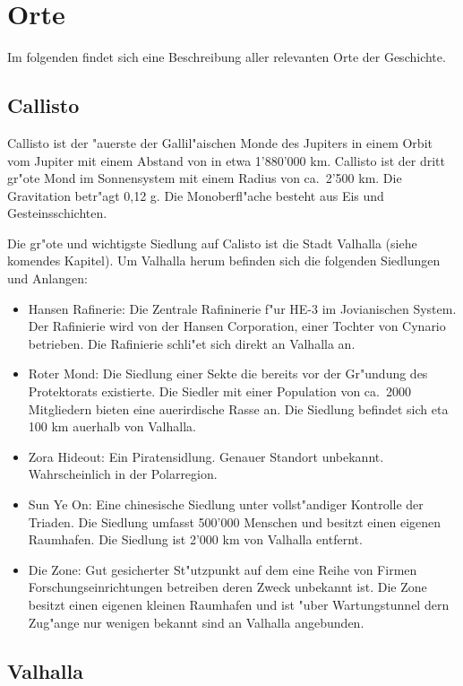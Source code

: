 \section{Orte}

Im folgenden findet sich eine Beschreibung aller relevanten Orte der Geschichte.

\subsection{Callisto}

Callisto ist der "au\3erste der Gallil"aischen Monde des Jupiters in einem Orbit vom Jupiter mit einem Abstand von in
etwa 1'880'000 km. Callisto ist der dritt gr"o\3te Mond im Sonnensystem mit einem Radius von ca.~2'500 km. Die
Gravitation betr"agt 0,12 g. Die Monoberfl"ache besteht aus Eis und Gesteinsschichten.

Die gr"o\3te und wichtigste Siedlung auf Calisto ist die Stadt Valhalla (siehe komendes Kapitel). Um Valhalla herum befinden
sich die folgenden Siedlungen und Anlangen:

\begin{itemize}
    \item Hansen Rafinerie: Die Zentrale Rafininerie f"ur HE-3 im Jovianischen System. Der Rafinierie wird von der Hansen 
    Corporation, einer Tochter von Cynario betrieben. Die Rafinierie schli"e\3t sich direkt an Valhalla an.
    \item Roter Mond: Die Siedlung einer Sekte die bereits vor der Gr"undung des Protektorats existierte. Die Siedler mit einer Population von ca.~2000 Mitgliedern bieten eine au\3erirdische Rasse an. Die Siedlung befindet sich eta 100 km au\3erhalb von Valhalla.
    \item Zora Hideout: Ein Piratensidlung. Genauer Standort unbekannt. Wahrscheinlich in der Polarregion.
    \item Sun Ye On: Eine chinesische Siedlung unter vollst"andiger Kontrolle der Triaden. Die Siedlung umfasst 500'000 Menschen und besitzt einen eigenen Raumhafen. Die Siedlung ist 2'000 km von Valhalla entfernt.
    \item Die Zone: Gut gesicherter St"utzpunkt auf dem eine Reihe von Firmen Forschungseinrichtungen betreiben deren Zweck unbekannt ist. Die Zone besitzt einen eigenen kleinen Raumhafen und ist "uber Wartungstunnel dern Zug"ange nur wenigen bekannt sind an Valhalla angebunden.
\end{itemize}

\subsection{Valhalla}

